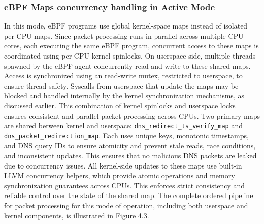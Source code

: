 \documentclass [11pt, proquest] {uwthesis}[2020/02/24]
\begin{document}
\subsubsection{\textbf{eBPF Maps concurrency handling in Active Mode}}
\label{active:sec3}
In this mode, eBPF programs use global kernel-space maps instead of isolated per-CPU maps. Since packet processing runs in parallel across multiple CPU cores, each executing the same eBPF program, concurrent access to these maps is coordinated using per-CPU kernel spinlocks. On userspace side, multiple threads spawned by the eBPF agent concurrently read and write to these shared maps. Access is synchronized using an read-write mutex, restricted to userspace, to ensure thread safety. Syscalls from userspace that update the maps may be blocked and handled internally by the kernel synchronization mechanisms, as discussed earlier. This combination of kernel spinlocks and userspace locks ensures consistent and parallel packet processing across CPUs. Two primary maps are shared between kernel and userspace: \texttt{dns\_redirect\_ts\_verify\_map} and \texttt{dns\_packet\_redirection\_map}. Each uses unique keys, monotonic timestamps, and DNS query IDs to ensure atomicity and prevent stale reads, race conditions, and inconsistent updates. This ensures that no malicious DNS packets are leaked due to concurrency issues. All kernel-side updates to these maps use built-in LLVM concurrency helpers, which provide atomic operations and memory synchronization guarantees across CPUs. This enforces strict consistency and reliable control over the state of the shared map. The complete ordered pipeline for packet processing for this mode of operation, including both userspace and kernel components, is illustrated in \hyperref[sec:dp-active-phase]{Figure 4.3}.




\end{document}
